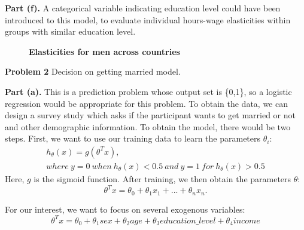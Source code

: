 \documentclass[letterpaper,12pt]{article}
\theoremstyle{definition}
\begin{document}
\textbf{Part (f).} A categorical variable indicating education level could have been introduced to this model, to evaluate individual hours-wage elasticities within groups with similar education level. 
\begin{figure}[htb]\centering\captionsetup{width=4.0in}
  \caption{\textbf{Elasticities for men across countries}}\label{FigEls}

\end{figure}

\newpage
\noindent\textbf{Problem 2}
Decision on getting married model.

\textbf{Part (a).} This is a prediction problem whose output set is \{0,1\}, so a logistic regression would be appropriate for this problem. To obtain the data, we can design a survey study which asks if the participant wants to get married or not and other demographic information. To obtain the model, there would be two steps. First, we want to use our training data to learn the parameters $\theta_i$:
\begin{gather*}
h_{\theta}(x)= g(\theta^Tx),\\
where\ y=0\ when\ h_{\theta}(x)<0.5\ and\ y=1\ for\ h_{\theta}(x)>0.5
\end{gather*}
Here, $g$ is the sigmoid function. After training, we then obtain the parameters $\theta$:
\begin{equation*}
  \theta^Tx= \theta_0 + \theta_1 x_1+ ... + \theta_n x_n.
\end{equation*}

For our interest, we want to focus on several exogenous variables:
\begin{equation*}
  \theta^Tx= \theta_0 + \theta_1 sex+ \theta_2 age + \theta_3 education\_level + \theta_4 income 
\end{equation*}
\end{document}
